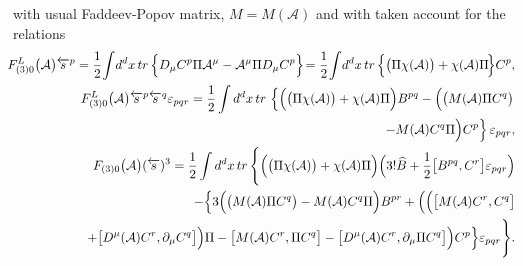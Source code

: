 \documentclass[10pt]{article}
\begin{document}
with usual Faddeev-Popov matrix, ${M}={M}(\mathcal{A})$ and with  taken account for the relations
\begin{eqnarray}
\hspace{-0.5em}&\hspace{-0.5em}& \hspace{-0.5em} \label{PauxsaKapp}    F^L_{(3)0}\big(\mathcal{A}\big) \overleftarrow{s}{}^{p} = \frac{1}{2}\hspace{-0.15em}\int\hspace{-0.15em} d^dx \,tr\, \Big\{D_\mu C^p \Pi\mathcal{A}^{\mu
}-\mathcal{A}^{\mu
}\Pi D_\mu C^p\Big\}\hspace{-0.15em}   = \frac{1}{2} \hspace{-0.15em}\int \hspace{-0.15em}d^dx \,tr\, \Big\{  \big(\Pi \chi(\mathcal{A})\big)+\chi(\mathcal{A})\Pi \hspace{-0.15em}\Big\}  C^p,\\
\hspace{-0.5em}&\hspace{-0.5em}& \hspace{-0.5em} F^L_{(3)0}\big(\mathcal{A}\big) \overleftarrow{s}{}^{p}\overleftarrow{s}{}^{q}\varepsilon_{pqr} =
\frac{1}{2} \int d^dx \,tr\, \left\{\Big(  \big(\Pi \chi(\mathcal{A})\big)+\chi(\mathcal{A})\Pi \Big)  B^{pq}-  \Big(  \big( {M}(\mathcal{A}) \Pi C^q \big) \right. \nonumber\\
\hspace{-0.5em}&\hspace{-0.5em}& \hspace{-0.5em}\phantom{F^L_{(3)0}\big(\mathcal{A}\big) \overleftarrow{s}{}^{p}\overleftarrow{s}{}^{q}\varepsilon_{pqr}} \left. -{M}(\mathcal{A})C^q\Pi \Big)  C^{p}\right\}\varepsilon_{pqr}
 , \label{Pauxapp} \\
\hspace{-0.5em}&\hspace{-0.5em}& \hspace{-0.5em} F_{(3)0}\big(\mathcal{A}\big) (\overleftarrow{s})^{3}=
\frac{1}{2} \int d^dx \,tr\, \Bigg\{\Big(  \big(\Pi \chi(\mathcal{A})\big)+\chi(\mathcal{A})\Pi \Big)  \Big(3!\widehat{B} +  \frac{1}{2} \big[B^{pq}, C^r\big] \varepsilon_{pqr} \Big) \nonumber\\
\hspace{-0.5em}&\hspace{-0.5em}& \hspace{-0.5em} \quad  -  \Big\{3\Big(   \big( {M}(\mathcal{A}) \Pi C^q \big) -{M}(\mathcal{A})C^q\Pi \Big)  B^{pr} +\Big( \Big(\big[{M}(\mathcal{A})C^r, C^{q}\big]
\nonumber\\
\hspace{-0.5em}&\hspace{-0.5em}& \hspace{-0.5em} \quad+ \big[D^\mu(\mathcal{A})C^r, \partial_\mu C^{q}\big]\Big)\Pi -  \big[{M}(\mathcal{A})C^r, \Pi C^{q}\big]
  -\big[D^\mu(\mathcal{A})C^r, \partial_\mu \Pi C^{q}\big]   \Big)  C^{p}\Big\}\varepsilon_{pqr}\Bigg\}.\label{Ps3(AB)app}%
\end{eqnarray}
\end{document}
